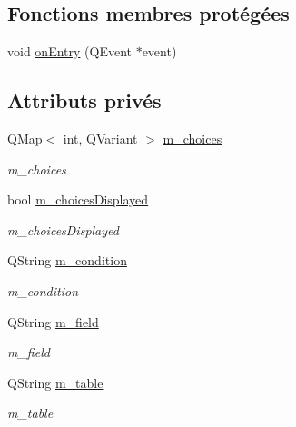 \subsection*{Fonctions membres protégées}
\begin{DoxyCompactItemize}
\item 
void \hyperlink{classSH__GenericState_a7c30692635023ce7cf65e5ba5bb18a9c}{on\-Entry} (Q\-Event $\ast$event)
\end{DoxyCompactItemize}
\subsection*{Attributs privés}
\begin{DoxyCompactItemize}
\item 
Q\-Map$<$ int, Q\-Variant $>$ \hyperlink{classSH__DatabaseContentQuestionState_a0bbbd0d3b22877dc9e78f81136f31618}{m\-\_\-choices}
\begin{DoxyCompactList}\small\item\em m\-\_\-choices \end{DoxyCompactList}\item 
bool \hyperlink{classSH__DatabaseContentQuestionState_aff4d8f402d9299029038ec4f21271b2b}{m\-\_\-choices\-Displayed}
\begin{DoxyCompactList}\small\item\em m\-\_\-choices\-Displayed \end{DoxyCompactList}\item 
Q\-String \hyperlink{classSH__DatabaseContentQuestionState_aaffd467fccc69b6d46194f04831a1edc}{m\-\_\-condition}
\begin{DoxyCompactList}\small\item\em m\-\_\-condition \end{DoxyCompactList}\item 
Q\-String \hyperlink{classSH__DatabaseContentQuestionState_a32b3f4f2cadbc4837add2556c1a926d4}{m\-\_\-field}
\begin{DoxyCompactList}\small\item\em m\-\_\-field \end{DoxyCompactList}\item 
Q\-String \hyperlink{classSH__DatabaseContentQuestionState_a95d8a6ffc051cd9283314a56f7a11296}{m\-\_\-table}
\begin{DoxyCompactList}\small\item\em m\-\_\-table \end{DoxyCompactList}\end{DoxyCompactItemize}


